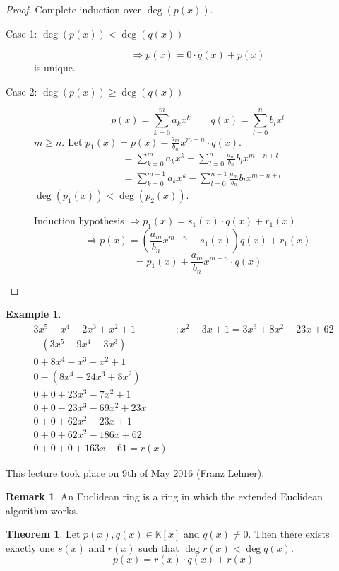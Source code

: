 \documentclass[a4paper,landscape,twocolumn]{article}
\newcommand\meta[3]{This #1 took place on #2 (#3).\par}
\theoremstyle{definition}
\newtheorem{theorem}{Theorem}
\newtheorem{ex}{Example}
\newtheorem{rem}{Remark}
\begin{document}
\begin{proof}
  Complete induction over $\deg(p(x))$.
  \begin{description}
    \item[Case 1: $\deg(p(x)) < \deg(q(x))$]
      \[ \Rightarrow p(x) = 0 \cdot q(x) + p(x) \]
      is unique.
    \item[Case 2: $\deg(p(x)) \geq \deg(q(x))$]
      \[ p(x) = \sum_{k=0}^m a_k x^k \qquad q(x) = \sum_{l=0}^n b_l x^l \]
      $m \geq n$.
      Let $p_1(x) = p(x) - \frac{a_m}{b_n} x^{m-n} \cdot q(x)$.
      \begin{align*}
        &= \sum_{k=0}^m a_k x^k - \sum_{l=0}^n \frac{a_m}{b_n} b_l x^{m-n+l} \\
        &= \sum_{k=0}^{m-1} a_k x^k - \sum_{l=0}^{n-1} \frac{a_m}{b_n} b_l x^{m-n+l}
      \end{align*}
      $\deg(p_1(x)) < \deg(p_2(x))$.

      Induction hypothesis $\Rightarrow p_1(x) = s_1(x) \cdot q(x) + r_1(x)$
      \[ \Rightarrow p(x) = \left(\frac{a_m}{b_n} x^{m-n} + s_1(x)\right) q(x) + r_1(x) \]
      \[ = p_1(x) + \frac{a_m}{b_n} x^{m-n} \cdot q(x) \]
  \end{description}
\end{proof}

\begin{ex}
  \label{bsp-9.18}
  \[
    \begin{array}{rl}
      3x^5 - x^4 + 2x^3 + x^2 + 1 &: x^2 - 3x + 1 = 3x^3 + 8x^2 + 23x + 62 \\
      -(3x^5 - 9x^4 + 3x^3)       &\\
    \hline
      0 + 8x^4 - x^3 + x^2 + 1 \\
      0 - (8x^4 - 24x^3 + 8x^2) \\
    \hline
      0 + 0 + 23x^3 - 7x^2 + 1 \\
      0 + 0 - 23x^3 - 69x^2 + 23x \\
    \hline
      0 + 0 + 62x^2 - 23x + 1 \\
      0 + 0 + 62x^2 - 186x + 62 \\
    \hline
      0 + 0 + 0 + 163x - 61 = r(x)
    \end{array}
  \]
\end{ex}

\meta{lecture}{9th of May 2016}{Franz Lehner}
\begin{rem}
  An Euclidean ring is a ring in which the extended Euclidean algorithm works.
\end{rem}
\begin{theorem}
  Let $p(x), q(x) \in \mathbb K[x]$ and $q(x) \neq 0$.
  Then there exists exactly one $s(x)$ and $r(x)$ such that $\deg{r(x)} < \deg{q(x)}$.
  \[ p(x) = r(x) \cdot q(x) + r(x) \]
\end{theorem}
\end{document}
